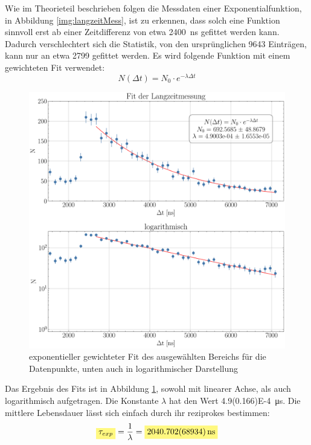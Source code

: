 \documentclass[12pt,a4paper,ngerman]{report}
\newcommand{\highlight}[1]{%
	\colorbox{yellow!50}{$\displaystyle#1$}} %
\begin{document}
	Wie im Theorieteil beschrieben folgen die Messdaten einer Exponentialfunktion, in Abbildung \ref{img:langzeitMess}, ist zu erkennen, dass solch eine Funktion sinnvoll erst ab einer Zeitdifferenz von etwa \SI{2400}{\nano \s} gefittet werden kann. Dadurch verschlechtert sich die Statistik, von den ursprünglichen 9643 Einträgen, kann nur an etwa 2799 gefittet werden. Es wird folgende Funktion mit einem gewichteten Fit verwendet:
	\begin{equation}
		N(\Delta t) = N_0 \cdot e^{-\lambda \Delta t}
	\end{equation}
	\begin{figure}[ht]
	\centering
	\includegraphics[width=\textwidth]{Bilder/FitlangzeitMess.pdf}		
	\caption[Fit der Langzeitmessung]{exponentieller gewichteter Fit des ausgewählten Bereichs für die Datenpunkte, unten auch in logarithmischer Darstellung}
		\label{img:FitlangzeitMess}
	\end{figure}
	Das Ergebnis des Fits ist in Abbildung \ref{img:FitlangzeitMess}, sowohl mit linearer Achse, als auch logarithmisch aufgetragen. Die Konstante $\lambda$ hat den Wert \SI{4.9(0.166)E-4}{\micro \s}. Die mittlere Lebensdauer lässt sich einfach durch ihr reziprokes bestimmen:
	\begin{equation}
		\highlight{\tau_{exp}} = \frac{1}{\lambda} = \highlight{\SI{2040.702(68.934)}{\nano \s}}
	\end{equation}
\end{document}
